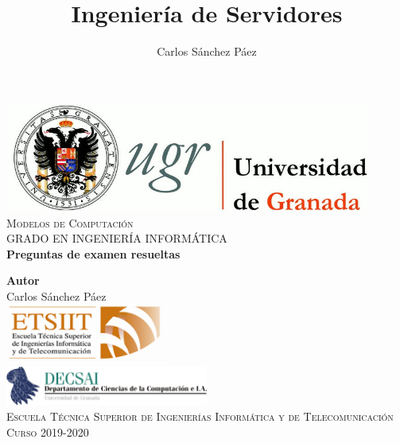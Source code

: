 \documentclass[12pt,spanish]{article}
\title{Ingeniería de Servidores}
\author{Carlos Sánchez Páez}
\begin{document}
\lstset{columns=fullflexible,basicstyle=\ttfamily}


\begin{titlepage}

 \newlength{\centeroffset}
 \setlength{\centeroffset}{-0.5\oddsidemargin}
 \addtolength{\centeroffset}{0.5\evensidemargin}
 \thispagestyle{empty}

 \noindent\hspace*{\centeroffset}
 \begin{minipage}{\textwidth}

  \centering
  \includegraphics[width=0.9\textwidth]{logo_ugr.jpg}\\[1.4cm]

  \textsc{ \Large Modelos de Computación\\[0.2cm]}
  \textsc{GRADO EN INGENIERÍA INFORMÁTICA}\\[1cm]

  {\Huge\bfseries Preguntas de examen resueltas\\}
 \end{minipage}

 \vspace{1.5cm}
 \noindent\hspace*{\centeroffset}
 \begin{minipage}{\textwidth}
  \centering

  \textbf{Autor}\\ {Carlos Sánchez Páez}\\[4ex]
  \includegraphics[width=0.4\textwidth]{etsiit_logo.png}\\[0.1cm]
  \vspace{1.5cm}
  \includegraphics[width=0.5\textwidth]{decsai.jpg}\\[0.1cm]
  \vspace{1cm}
  \textsc{Escuela Técnica Superior de Ingenierías Informática y de Telecomunicación}\\
  \vspace{1cm}
  \textsc{Curso 2019-2020}
 \end{minipage}
\end{titlepage}
\thispagestyle{empty}
\newpage
\end{document}
